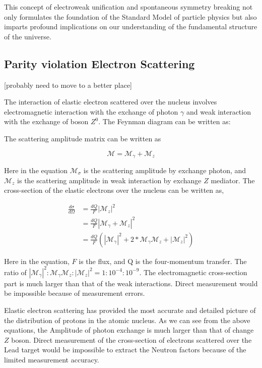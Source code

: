 This concept of electroweak unification and spontaneous symmetry breaking not only formulates the foundation of the Standard Model of particle physics but also imparts profound implications on our understanding of the fundamental structure of the universe. 


\subsection{Parity violation Electron Scattering}

[probably need to move to a better place]

The interaction of elastic electron scattered over the nucleus involves electromagnetic interaction with the exchange of photon $\gamma$ and weak interaction with the exchange of boson $Z^0$. The Feynman diagram can be written as:


The scattering amplitude matrix can be written as

\begin{equation}
    \mathcal{M} = \mathcal{M}_{\gamma} + \mathcal{M}_z
\end{equation}


Here in the equation $\mathcal{M}_{\sigma}$ is the scattering amplitude by exchange photon, and $\mathcal{M}_z$ is the scattering amplitude in weak interaction by exchange $Z$ mediator.  The cross-section of the elastic electrons over the nucleus can be written as, 

\begin{equation}
\begin{split}
        \frac{d\sigma}{d\Omega} &= \frac{dQ}{F} |  \mathcal{M}_z|^2 \\
        &= \frac{dQ}{F}|\mathcal{M}_{\gamma} + \mathcal{M}_z|^2 \\ 
        &= \frac{dQ}{F}(|\mathcal{M}_{\gamma}|^2 + 2*\mathcal{M}_{\gamma}\mathcal{M}_z + |\mathcal{M}_z|^2)
\end{split}
\end{equation}

Here in the equation, $F$ is the flux, and Q is the four-momentum transfer. The ratio of $|\mathcal{M}_{\gamma}|^2 : \mathcal{M}_{\gamma}\mathcal{M}_z : |\mathcal{M}_z|^2 = 1 : 10^{-4} : 10^{-9}$. The electromagnetic cross-section part is much larger than that of the weak interactions. Direct measurement would be impossible because of measurement errors. 


Elastic electron scattering has provided the most accurate and detailed picture of the distribution of protons in the atomic nucleus. As we can see from the above equations, the Amplitude of photon exchange is much larger than that of change $Z$ boson. Direct measurement of the cross-section of electrons scattered over the Lead target would be impossible to extract the Neutron factors because of the limited measurement accuracy.


